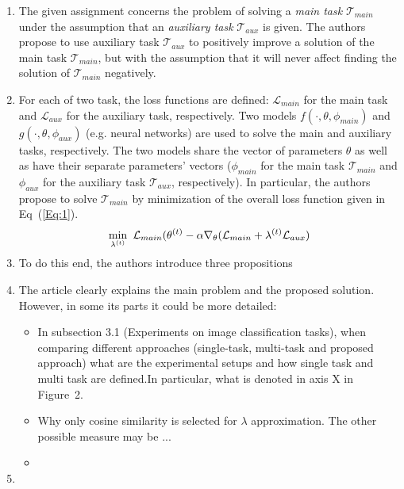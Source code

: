 \documentclass{article} %
\begin{document}
\begin{enumerate}
	\item The given assignment concerns the problem of solving a \textit{main task} $ \mathcal{T}_{main} $ under the assumption that an \textit{auxiliary task} $ \mathcal{T}_{aux} $ is given. The authors propose to use auxiliary task $ \mathcal{T}_{aux} $ to positively improve a solution of the main task $ \mathcal{T}_{main} $, but with the assumption that it will never affect finding the solution of $ \mathcal{T}_{main} $ negatively. 
	\item For each of two task, the loss functions are defined: $ \mathcal{L}_{main} $ for the main task and $ \mathcal{L}_{aux} $ for the auxiliary task, respectively. Two models $ f(\cdot,\theta,\phi_{main}) $ and $g(\cdot,\theta,\phi_{aux})$ (e.g. neural networks) are used to solve the main and auxiliary tasks, respectively. The two models share the vector of parameters $ \theta $ as well as have their separate parameters' vectors ($ \phi_{main} $ for the main task $ \mathcal{T}_{main} $ and $ \phi_{aux} $ for the auxiliary task $ \mathcal{T}_{aux} $, respectively). In particular, the authors propose to solve $ \mathcal{T}_{main} $ by minimization of the overall loss function given in Eq~(\ref{Eq:1}).
	\begin{equation}
		\smash{\displaystyle\min \limits_{\lambda^{(t)}}} \texttt{  } \mathcal{L}_{main}(\theta^{(t)} - \alpha\nabla_{\theta}(\mathcal{L}_{main} + \lambda^{(t)}\mathcal{L}_{aux})
	\label{Eq:1}
	\end{equation}  
	\item To do this end, the authors introduce three propositions 
	\item The article clearly explains the main problem and the proposed solution. However, in some its parts it could be more detailed: 
	\begin{itemize}
		\item In subsection 3.1 (Experiments on image classification tasks), when comparing different approaches (single-task, multi-task and proposed approach) what are the experimental setups and how single task and multi task are defined.In particular, what is denoted in axis X in Figure~2.
		\item Why only cosine similarity is selected for $ \lambda $ approximation. The other possible measure may be ...
		\item 
	\end{itemize}  
	\item 
\end{enumerate}
\end{document}
